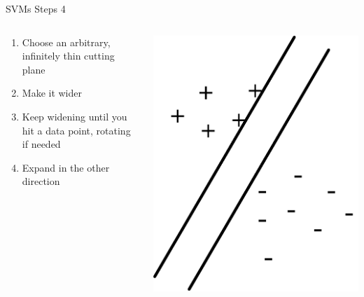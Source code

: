 \documentclass[aspectratio=169]{beamer}
\begin{document}
\begin{frame}{SVMs Steps 4}

\begin{columns}[T]
\begin{column}{0.6\textwidth}
\begin{enumerate}
\item  Choose an arbitrary, infinitely thin cutting plane
\item Make it wider
\item Keep widening until you hit a data point, rotating if needed
\item Expand in the other direction
\end{enumerate}
\end{column}
\begin{column}{0.4\textwidth}
\includegraphics[width=1\textwidth]{lectSVM/svm5}
\end{column}
\end{columns}
\end{frame}
\end{document}
